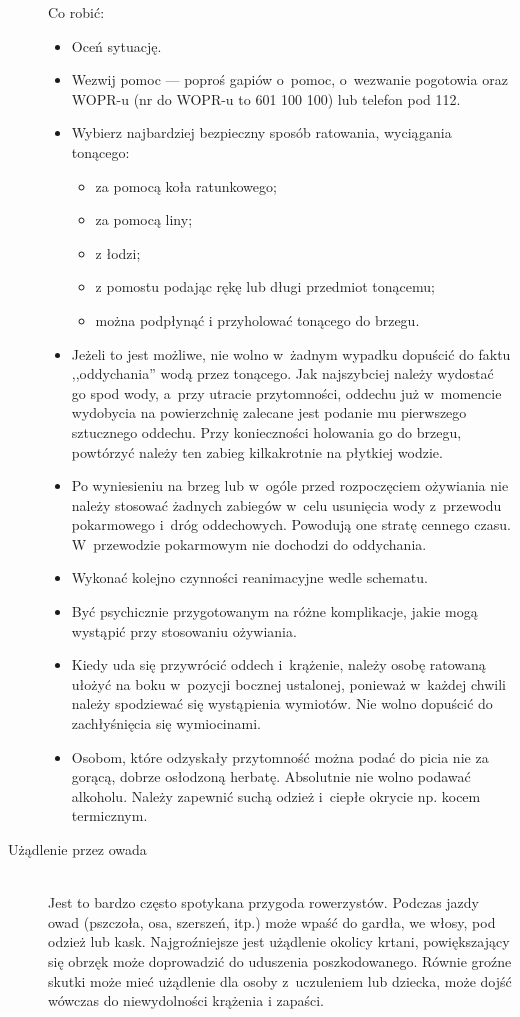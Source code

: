 \documentclass[a5paper,10pt,titlepage,twoside]{article}
\begin{document}
\begin{description}
Co robić:
\begin{itemize}
\item Oceń sytuację.
\item Wezwij pomoc --- poproś gapiów o~pomoc, o~wezwanie pogotowia oraz WOPR-u (nr do WOPR-u to 601 100 100) lub telefon pod 112.
\item Wybierz najbardziej bezpieczny sposób ratowania, wyciągania tonącego:
\begin{itemize}
\item za pomocą koła ratunkowego;
\item za pomocą liny;
\item z łodzi;
\item z pomostu podając rękę lub długi przedmiot tonącemu;
\item można podpłynąć i przyholować tonącego do brzegu.
\end{itemize}
\item Jeżeli to jest możliwe, nie wolno w~żadnym wypadku dopuścić do faktu ,,oddychania'' wodą przez tonącego. Jak najszybciej należy wydostać go spod wody, a~przy utracie przytomności, oddechu już w~momencie wydobycia na powierzchnię zalecane jest podanie mu pierwszego sztucznego oddechu. Przy konieczności holowania go do brzegu, powtórzyć należy ten zabieg kilkakrotnie na płytkiej wodzie.
\item Po wyniesieniu na brzeg lub w~ogóle przed rozpoczęciem ożywiania nie należy stosować żadnych zabiegów w~celu usunięcia wody z~przewodu pokarmowego i~dróg oddechowych. Powodują one stratę cennego czasu. W~przewodzie pokarmowym nie dochodzi do oddychania.
\item Wykonać kolejno czynności reanimacyjne wedle schematu.
\item Być psychicznie przygotowanym na różne komplikacje, jakie mogą wystąpić przy stosowaniu ożywiania.
\item Kiedy uda się przywrócić oddech i~krążenie, należy osobę ratowaną ułożyć na boku w~pozycji bocznej ustalonej, ponieważ w~każdej chwili należy spodziewać się wystąpienia wymiotów. Nie wolno dopuścić do zachłyśnięcia się wymiocinami.
\item Osobom, które odzyskały przytomność można podać do picia nie za gorącą, dobrze osłodzoną herbatę. Absolutnie nie wolno podawać alkoholu. Należy zapewnić suchą odzież i~ciepłe okrycie np. kocem termicznym.
\end{itemize}
\item[Użądlenie przez owada] \hfill \\ Jest to bardzo często spotykana przygoda rowerzystów. Podczas jazdy owad (pszczoła, osa, szerszeń, itp.) może wpaść do gardła, we włosy, pod odzież lub kask. Najgroźniejsze jest użądlenie okolicy krtani, powiększający się obrzęk może doprowadzić do uduszenia poszkodowanego. Równie groźne skutki może mieć użądlenie dla osoby z~uczuleniem lub dziecka, może dojść wówczas do niewydolności krążenia i zapaści.

\end{description}
\end{document}
